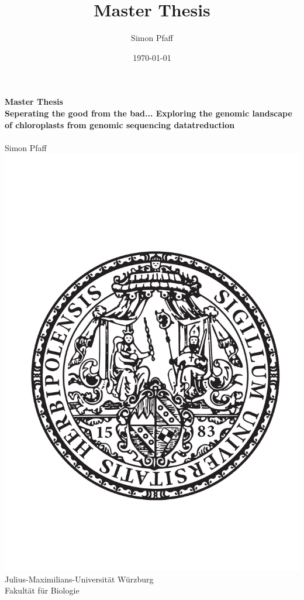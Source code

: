 \documentclass{scrartcl}
\author{Simon Pfaff}
\date{\today}
\title{Master Thesis}
\begin{document}
\begin{center}
\thispagestyle{empty}
\textbf{\huge Master Thesis}\\[2mm]
\textbf{\huge Seperating the good from the bad... Exploring the genomic landscape of chloroplasts from genomic sequencing datatreduction}\\[5mm]
\textbf{\LARGE }\\[3mm]
{\LARGE Simon Pfaff}\\[2mm]
\includegraphics[width=.7\linewidth]{./neuSIEGEL.pdf}
{\large Julius-Maximilians-Universität Würzburg}\\[1mm]
{\large Fakultät für Biologie}
\end{center}
\cleardoublepage
\
\thispagestyle{empty}
\maketitle
\end{document}
